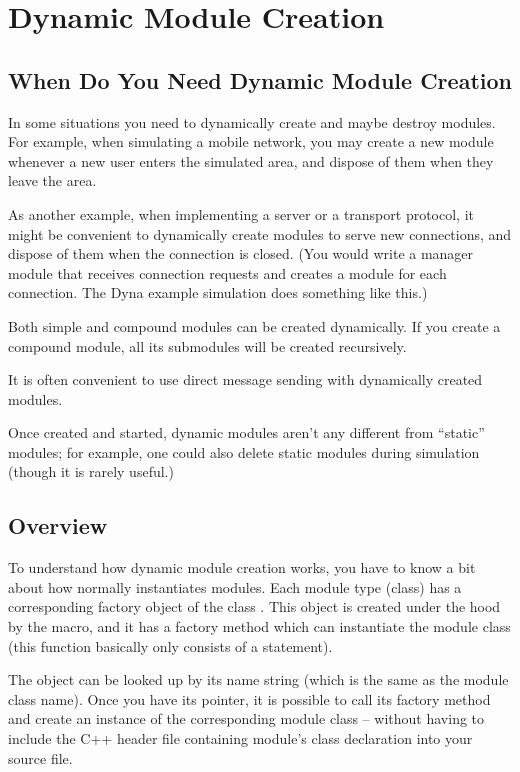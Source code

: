 \section{Dynamic Module Creation}
\label{sec:simple-modules:dynamic-module-creation}

\subsection{When Do You Need Dynamic Module Creation}

In some situations you need to dynamically create and maybe destroy
modules. For example, when simulating a mobile network,
you may create a new module whenever a new user enters
the simulated area, and dispose of them when they leave the area.

As another example, when implementing a server or a transport
protocol, it might be convenient to dynamically create modules
to serve new connections, and dispose of them when the connection
is closed. (You would write a manager module that receives connection
requests and creates a module for each connection.
The Dyna example simulation does something like this.)

Both simple and compound modules can be created dynamically.
If you create a compound module, all its submodules will be created
recursively.

It is often convenient to use direct message sending with dynamically
created modules.

Once created and started, dynamic modules aren't any different from
``static'' modules; for example, one could also delete static modules
during simulation (though it is rarely useful.)


\subsection{Overview}


To understand how dynamic module creation works, you have to know a
bit about how normally {\opp} instantiates modules. Each module type
(class) has a corresponding factory object of the class
. This object is created under the hood by the
 macro, and it has a factory
method which can instantiate the module class (this function basically
only consists of a  statement).

The  object can be looked up by its name
string (which is the same as the module class name). Once you have its
pointer, it is possible to call its factory method and create an
instance of the corresponding module class -- without having to
include the C++ header file containing module's class declaration
into your source file.

